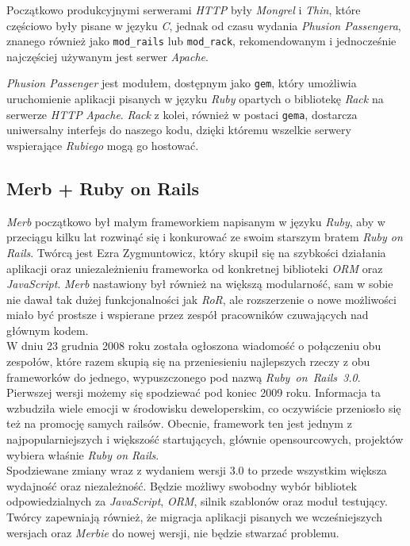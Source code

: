 \documentclass[12pt,twoside]{report}
\begin{document}
Początkowo produkcyjnymi serwerami \emph{HTTP} były \emph{Mongrel} i \emph{Thin}, które
częściowo były pisane w języku \emph{C}, jednak od czasu wydania \emph{Phusion Passengera},
znanego również jako \texttt{mod\_rails} lub \texttt{mod\_rack}, rekomendowanym i
jednocześnie najczęściej używanym jest serwer \emph{Apache}.


\emph{Phusion Passenger} jest modułem, dostępnym jako \texttt{gem}, który umożliwia
uruchomienie aplikacji pisanych w języku \emph{Ruby} opartych o bibliotekę \emph{Rack} na
serwerze \emph{HTTP} \emph{Apache}. \emph{Rack} z kolei, również w postaci \texttt{gema},
dostarcza uniwersalny interfejs do naszego kodu, dzięki któremu wszelkie serwery
wspierające \emph{Rubiego} mogą go hostować.


\subsection{Merb + Ruby on Rails}
\emph{Merb} początkowo był małym frameworkiem napisanym w języku \emph{Ruby}, aby w
przeciągu kilku lat rozwinąć się i konkurować ze swoim starszym bratem \emph{Ruby on
Rails}. Twórcą jest Ezra Zygmuntowicz, który skupił się na szybkości działania aplikacji
oraz uniezależnieniu frameworka od konkretnej biblioteki \emph{ORM} oraz \emph{JavaScript}.
\emph{Merb} nastawiony był również na większą modularność, sam w sobie nie dawał tak
dużej funkcjonalności jak \emph{RoR}, ale rozszerzenie o nowe możliwości miało być
prostsze i wspierane przez zespół pracowników czuwających nad głównym kodem.\\
W dniu 23 grudnia 2008 roku została ogłoszona wiadomość \cite{rails-merb} o połączeniu obu zespołów,
które razem skupią się na przeniesieniu najlepszych rzeczy z obu frameworków do jednego,
wypuszczonego pod nazwą \emph{Ruby~on~Rails~3.0}. Pierwszej wersji możemy się spodziewać
pod koniec 2009 roku. Informacja ta wzbudziła wiele emocji w środowisku deweloperskim, co
oczywiście przeniosło się też na promocję samych railsów. Obecnie, framework ten jest
jednym z najpopularniejszych i większość startujących, głównie opensourcowych,
projektów wybiera właśnie \emph{Ruby on Rails}.\\
Spodziewane zmiany wraz z wydaniem wersji 3.0 to przede wszystkim większa
wydajność oraz niezależność. Będzie możliwy swobodny wybór bibliotek odpowiedzialnych za
\emph{JavaScript}, \emph{ORM}, silnik szablonów oraz moduł testujący. Twórcy zapewniają
również, że migracja aplikacji pisanych we wcześniejszych wersjach oraz \emph{Merbie} do nowej
wersji, nie będzie stwarzać problemu.
\end{document}
